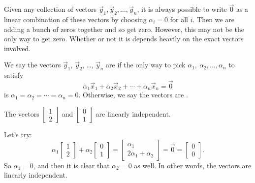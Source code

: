 \documentclass{ximera}
\begin{document}
Given any collection of vectors $\vec{y}_1, \vec{y}_2, \ldots, \vec{y}_n$, it is always possible to write $\vec{0}$ as a linear combination of these vectors by choosing $\alpha_i = 0$ for all $i$. Then we are adding a bunch of zeros together and so get zero. However, this may not be the only way to get zero. Whether or not it is depends heavily on the exact vectors involved.

\begin{definition}
    We say the vectors $\vec{y}_1$, $\vec{y}_2$, \ldots, $\vec{y}_n$ are
    \emph{} if the only way to pick $\alpha_1,\ \alpha_2, ..., \alpha_n$ to satisfy
    \begin{equation*}
        \alpha_1 \vec{x}_1 + \alpha_2 \vec{x}_2 + \cdots + \alpha_n \vec{x}_n  = \vec{0}
    \end{equation*}
    is $\alpha_1 = \alpha_2 = \cdots = \alpha_n = 0$. Otherwise, we say the vectors are \emph{}.
\end{definition}

\begin{example} The vectors
    $\left[ \begin{smallmatrix} 1 \\ 2 \end{smallmatrix} \right]$ and $\left[ \begin{smallmatrix} 0 \\ 1 \end{smallmatrix} \right]$ are linearly independent.
\end{example}

\begin{exampleSol}
    Let's try:
    \begin{equation*}
        \alpha_1 
        \begin{bmatrix} 1 \\ 2 \end{bmatrix}
        + \alpha_2
        \begin{bmatrix} 0 \\ 1 \end{bmatrix}
        =
        \begin{bmatrix} \alpha_1 \\ 2 \alpha_1 + \alpha_2 \end{bmatrix}
        =
        \vec{0} =
        \begin{bmatrix} 0 \\ 0 \end{bmatrix} .
    \end{equation*}
    So $\alpha_1 = 0$, and then it is clear that $\alpha_2 = 0$ as well.  In other words, the vectors are linearly independent.
\end{exampleSol}
\end{document}
